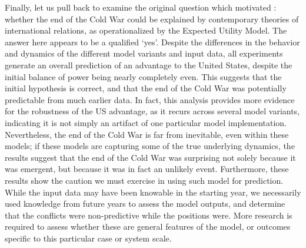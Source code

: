 Finally, let us pull back to examine the original question which motivated \citet{bdm_1998}: whether the end of the Cold War could be explained by contemporary theories of international relations, as operationalized by the Expected Utility Model. The answer here appears to be a qualified `yes'. Despite the differences in the behavior and dynamics of the different model variants and input data, all experiments generate an overall prediction of an advantage to the United States, despite the initial balance of power being nearly completely even. This suggests that the initial hypothesis is correct, and that the end of the Cold War was potentially predictable from much earlier data. In fact, this analysis provides more evidence for the robustness of the US advantage, as it recurs across several model variants, indicating it is not simply an artifact of one particular model implementation. Nevertheless, the end of the Cold War is far from inevitable, even within these models; if these models are capturing some of the true underlying dynamics, the results suggest that the end of the Cold War was surprising not solely because it was emergent, but because it was in fact an unlikely event. Furthermore, these results show the caution we must exercise in using such model for prediction. While the input data may have been knowable in the starting year, we necessarily used knowledge from future years to assess the model outputs, and determine that the conflicts were non-predictive while the positions were. More research is required to assess whether these are general features of the model, or outcomes specific to this particular case or system scale.